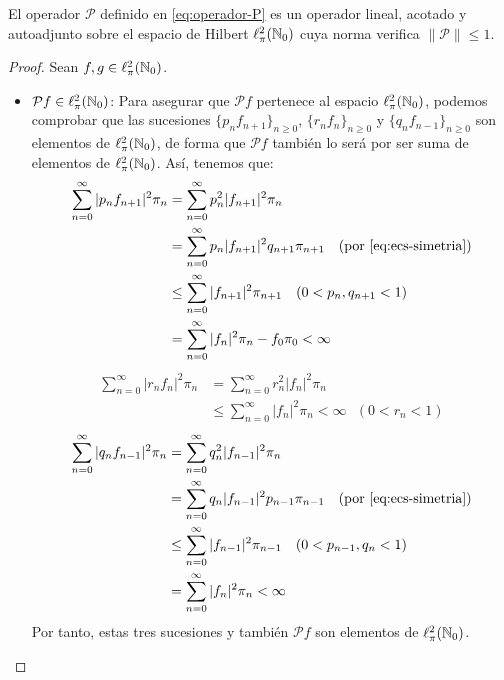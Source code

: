     \begin{lema}
        El operador $\mathcal P$ definido en \eqref{eq:operador-P} es un operador lineal, acotado y autoadjunto sobre el espacio de Hilbert $\ell^2_\pi(\mathbb{N}_0)$ cuya norma verifica $\|\mathcal P\|\leq 1$.
    \end{lema}
    \begin{proof} Sean $f,g\in\ell^2_\pi(\mathbb{N}_0)$.
        \begin{itemize}
            \item $\mathcal P f\in \ell^2_\pi(\mathbb{N}_0)$: Para asegurar que $\mathcal P f$ pertenece al espacio $\ell^2_\pi(\mathbb{N}_0)$, podemos comprobar que las sucesiones $\{p_n f_{n+1}\}_{n\geq 0}$, $\{r_n f_{n}\}_{n\geq 0}$ y $\{q_n f_{n-1}\}_{n\geq 0}$ son elementos de $\ell^2_\pi(\mathbb{N}_0)$, de forma que $\mathcal P f$ también lo será por ser suma de elementos de $\ell^2_\pi(\mathbb{N}_0)$. Así, tenemos que:
            \begin{equation*}
                \begin{split}
                    \sum_{n=0}^\infty |p_n f_{n+1}|^2 \pi_n &= \sum_{n=0}^\infty p_n^2 |f_{n+1}|^2 \pi_n \\
                    &= \sum_{n=0}^\infty p_n |f_{n+1}|^2 q_{n+1}\pi_{n+1} \ \ \ \text{(por \eqref{eq:ecs-simetria})} \\
                    &\leq  \sum_{n=0}^\infty  |f_{n+1}|^2\pi_{n+1} \ \ \ (0<p_n,q_{n+1} <1) \\
                    &= \sum_{n=0}^\infty |f_n|^2 \pi_n - f_0\pi_0 < \infty
                \end{split}
            \end{equation*}
            \begin{equation*}
                \begin{split}
                    \sum_{n=0}^\infty |r_n f_{n}|^2 \pi_n &= \sum_{n=0}^\infty r_n^2 |f_{n}|^2 \pi_n \\
                    &\leq  \sum_{n=0}^\infty  |f_{n}|^2\pi_{n} < \infty \ \ \ (0<r_n <1)
                \end{split}
            \end{equation*}
            \begin{equation*}
                \begin{split}
                    \sum_{n=0}^\infty |q_n f_{n-1}|^2 \pi_n &= \sum_{n=0}^\infty q_n^2 |f_{n-1}|^2 \pi_n \\
                    &= \sum_{n=0}^\infty q_n |f_{n-1}|^2 p_{n-1}\pi_{n-1} \ \ \ \text{(por \eqref{eq:ecs-simetria})} \\
                    &\leq  \sum_{n=0}^\infty  |f_{n-1}|^2\pi_{n-1} \ \ \ (0<p_{n-1},q_{n} <1) \\
                    &= \sum_{n=0}^\infty |f_n|^2 \pi_n  < \infty
                \end{split}
            \end{equation*}
            Por tanto, estas tres sucesiones y también $\mathcal P f$ son elementos de $\ell^2_\pi(\mathbb{N}_0)$.


\end{itemize}
\end{proof}
